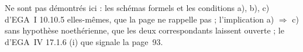 Ne sont pas démontrés ici : les schémas formels et les conditions a), b), c) d'EGA~I 10.10.5 elles-mêmes, que la page ne rappelle pas ; l'implication a) $\Rightarrow$ c) sans hypothèse noethérienne, que les deux correspondants laissent ouverte ; le  d'EGA~IV 17.1.6 (i) que signale la page~93.
